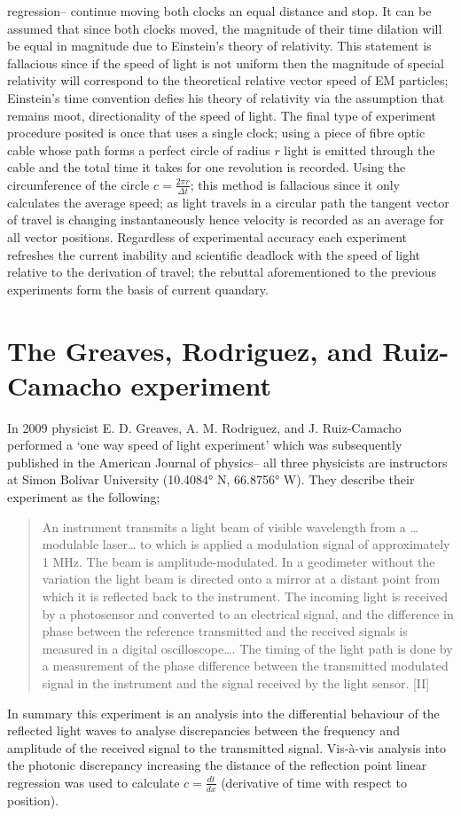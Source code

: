 \documentclass[12pt,letterpaper]{article}
\begin{document}
regression– continue moving both clocks an equal distance and stop. It can be assumed that since both clocks moved, the magnitude of their time dilation will be equal in magnitude due to Einstein's theory of relativity. This statement is fallacious since if the speed of light is not uniform then the magnitude of special relativity will correspond to the theoretical relative vector speed of EM particles; Einstein's time convention defies his theory of relativity via the assumption that remains moot, directionality of the speed of light. The final type of experiment procedure posited is once that uses a single clock; using a piece of fibre optic cable whose path forms a perfect circle of radius $r$ light is emitted through the cable and the total time it takes for one revolution is recorded. Using the circumference of the circle $c=\frac{2\pi r}{\Delta t}$; this method is fallacious since it only calculates the average speed; as light travels in a circular path the tangent vector of travel is changing instantaneously hence velocity is recorded as an average for all vector positions. Regardless of experimental accuracy each experiment refreshes the current inability and scientific deadlock with the speed of light relative to the derivation of travel; the rebuttal aforementioned to the previous experiments form the basis of current quandary.

\section{The Greaves, Rodriguez, and Ruiz-Camacho experiment}
In 2009 physicist E. D. Greaves, A. M. Rodriguez, and J. Ruiz-Camacho performed a ‘one way speed of light experiment’ which was subsequently published in the American Journal of physics– all three physicists are instructors at Simon Bolivar University (10.4084° N, 66.8756° W).  They describe their experiment as the following;  
\begin{quote}
An instrument transmits a light beam of visible wavelength from a … modulable laser… to which is applied a modulation signal of approximately 1 MHz. The beam is amplitude-modulated. In a geodimeter without the variation the light beam is directed onto a mirror at a distant point from which it is reflected back to the instrument. The incoming light is received by a photosensor and converted to an electrical signal, and the difference in phase between the reference transmitted and the received signals is measured in a digital oscilloscope…. The timing of the light path is done by a measurement of the phase difference between the transmitted modulated signal in the instrument and the signal received by the light sensor. [II]
\end{quote}
In summary this experiment is an analysis into the differential behaviour of the reflected light waves to analyse discrepancies between the frequency and amplitude of the received signal to the transmitted signal. Vis-à-vis analysis into the photonic discrepancy increasing the distance of the reflection point linear regression was used to calculate $c=\frac{dt}{dx}$ (derivative of time with respect to position). 
\end{document}
